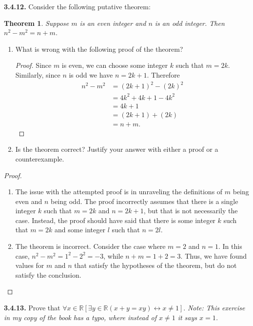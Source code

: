 \documentclass[12pt]{amsart}
\newenvironment{statement}[1]{\smallskip\noindent\color[rgb]{.6627, .3529, .6314} {\bf #1.}}{}
\newtheorem{theorem}{Theorem}
\theoremstyle{definition}
\theoremstyle{remark}
\newcommand{\BR}{\mathbb R}
\begin{document}
\begin{statement}{3.4.12}
Consider the following putative theorem:
\begin{theorem}
	Suppose $m$ is an even integer and $n$ is an odd integer.
	Then $n^2 - m^2 = n + m$.
\end{theorem}
\begin{enumerate}
	\item What is wrong with the following proof of the theorem?
	\begin{proof}
		Since $m$ is even, we can choose some integer $k$ such that $m = 2k$.
		Similarly, since $n$ is odd we have $n = 2k + 1$.
		Therefore
		\begin{align*}
			n^2 - m^2 &= (2k + 1)^2 - (2k)^2 \\
			&= 4k^2 + 4k + 1 - 4k^2 \\
			&= 4k + 1 \\
			&= (2k + 1) + (2k) \\
			&= n + m.
		\end{align*}
	\end{proof}
	
	\item Is the theorem correct?
	Justify your answer with either a proof or a counterexample.
\end{enumerate}
\end{statement}

\begin{proof}
\hfill
\begin{enumerate}
	\item The issue with the attempted proof is in unraveling the definitions of
	$m$ being even and $n$ being odd.
	The proof incorrectly assumes that there is a single integer $k$ 
	such that $m = 2k$ and $n = 2k + 1$, but that is not necessarily the case.
	Instead, the proof should have said that there is some integer $k$ such that $m = 2k$
	and some integer $l$ such that $n = 2l$.
	
	\item The theorem is incorrect.
	Consider the case where $m = 2$ and $n = 1$.
	In this case, $n^2 - m^2 = 1^2 - 2^2 = -3$, while $n + m = 1 + 2 = 3$.
	Thus, we have found values for $m$ and $n$ that satisfy the hypotheses of the theorem,
	but do not satisfy the conclusion.
\end{enumerate}
\end{proof}


\begin{statement}{3.4.13}
Prove that $\forall x \in \BR [ \exists y \in \BR (x + y = xy) \leftrightarrow x \neq 1]$.
\emph{Note: This exercise in my copy of the book has a typo, where instead of $x \neq 1$ it says $x = 1$.}
\end{statement}
\end{document}
